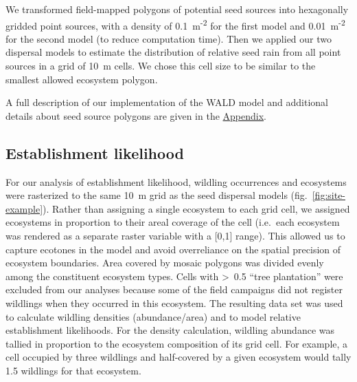 \documentclass[
]{article}
\begin{document}
We transformed field-mapped polygons of potential seed sources into hexagonally
gridded point sources, with a density of 0.1~m\textsuperscript{-2} for the first model and
0.01~m\textsuperscript{-2} for the second model (to reduce computation time). Then we applied
our two dispersal models to estimate the distribution of relative seed rain from
all point sources in a grid of 10~m cells. We chose this cell size to be similar
to the smallest allowed ecosystem polygon.

A full description of our implementation of the WALD model and additional
details about seed source polygons are given in the \hyperref[appendix]{Appendix}.

\subsection{Establishment likelihood}\label{establishment-likelihood}

For our analysis of establishment likelihood, wildling occurrences and
ecosystems were rasterized to the same 10~m grid as the seed dispersal models
(fig.~\ref{fig:site-example}). Rather than assigning a single ecosystem to each
grid cell, we assigned ecosystems in proportion to their areal coverage of the
cell (i.e.~each ecosystem was rendered as a separate raster variable with a
{[}0,1{]} range). This allowed us to capture ecotones in the model and avoid
overreliance on the spatial precision of ecosystem boundaries. Area covered by
mosaic polygons was divided evenly among the constituent ecosystem types. Cells
with \textgreater~0.5 ``tree plantation'' were excluded from our analyses because some of
the field campaigns did not register wildlings when they occurred in this
ecosystem. The resulting data set was used to calculate wildling densities
(abundance/area) and to model relative establishment likelihoods. For the
density calculation, wildling abundance was tallied in proportion to the
ecosystem composition of its grid cell. For example, a cell occupied by three
wildlings and half-covered by a given ecosystem would tally 1.5 wildlings for
that ecosystem.
\end{document}
